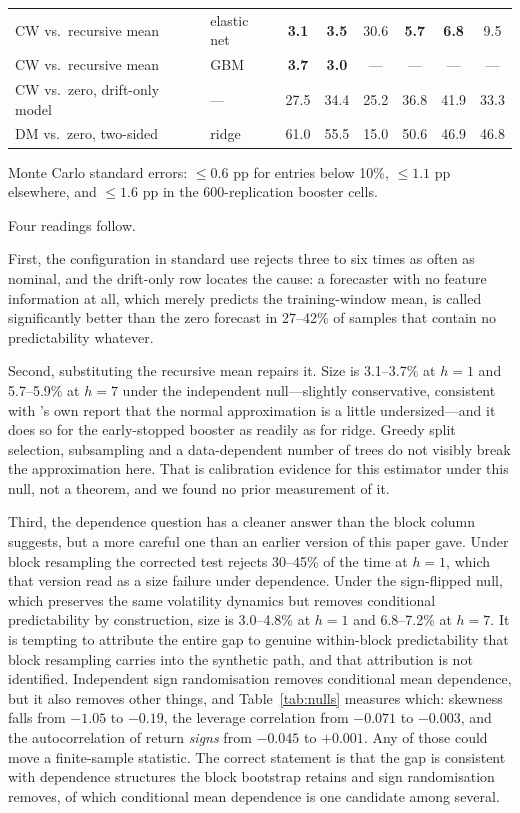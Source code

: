 \documentclass{article}
\theoremstyle{plain}
\theoremstyle{definition}
\begin{document}
\begin{table}[t]
\begin{tabular}{llccc@{\qquad}ccc}
    CW vs.\ recursive mean & elastic net & \textbf{3.1} & \textbf{3.5} & 30.6 & \textbf{5.7} & \textbf{6.8} & 9.5 \\
    CW vs.\ recursive mean & GBM         & \textbf{3.7} & \textbf{3.0} & ---  & ---  & ---  & ---  \\
    \midrule
    CW vs.\ zero, drift-only model & --- & 27.5 & 34.4 & 25.2 & 36.8 & 41.9 & 33.3 \\
    DM vs.\ zero, two-sided        & ridge & 61.0 & 55.5 & 15.0 & 50.6 & 46.9 & 46.8 \\
    \bottomrule
  \end{tabular}
  \par\smallskip
  {\footnotesize Monte Carlo standard errors: $\le 0.6$ pp for entries below 10\%,
  $\le 1.1$ pp elsewhere, and $\le 1.6$ pp in the 600-replication booster cells.}
\end{table}

Four readings follow.

First, the configuration in standard use rejects three to six times as often as
nominal, and the drift-only row locates the cause: a forecaster with no feature
information at all, which merely predicts the training-window mean, is called
significantly better than the zero forecast in 27--42\% of samples that contain no
predictability whatever.

Second, substituting the recursive mean repairs it. Size is 3.1--3.7\% at $h=1$ and
5.7--5.9\% at $h=7$ under the independent null---slightly conservative, consistent
with \citet{clark2007}'s own report that the normal approximation is a little
undersized---and it does so for the early-stopped booster as readily as for ridge.
Greedy split selection, subsampling and a data-dependent number of trees do not
visibly break the approximation here. That is calibration evidence for this
estimator under this null, not a theorem, and we found no prior measurement of it.

Third, the dependence question has a cleaner answer than the block column suggests, but a
more careful one than an earlier version of this paper gave. Under block resampling the
corrected test rejects 30--45\% of the time at $h=1$, which that version read as a size
failure under dependence. Under the sign-flipped null, which preserves the same volatility
dynamics but removes conditional predictability by construction, size is 3.0--4.8\% at $h=1$
and 6.8--7.2\% at $h=7$. It is tempting to attribute the entire gap to genuine within-block
predictability that block resampling carries into the synthetic path, and that attribution is
not identified. Independent sign randomisation removes conditional mean dependence, but it
also removes other things, and Table~\ref{tab:nulls} measures which: skewness falls from
$-1.05$ to $-0.19$, the leverage correlation from $-0.071$ to $-0.003$, and the
autocorrelation of return \emph{signs} from $-0.045$ to $+0.001$. Any of those could move a
finite-sample statistic. The correct statement is that the gap is consistent with dependence
structures the block bootstrap retains and sign randomisation removes, of which conditional
mean dependence is one candidate among several.
\end{document}
